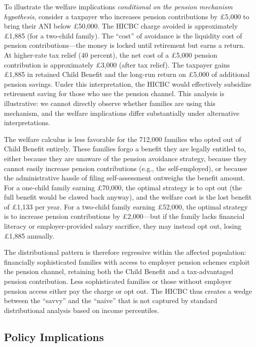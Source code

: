 \documentclass[12pt]{article}
\begin{document}
To illustrate the welfare implications \emph{conditional on the pension mechanism hypothesis}, consider a taxpayer who increases pension contributions by \pounds5,000 to bring their ANI below \pounds50,000. The HICBC charge avoided is approximately \pounds1,885 (for a two-child family). The ``cost'' of avoidance is the liquidity cost of pension contributions---the money is locked until retirement but earns a return. At higher-rate tax relief (40 percent), the net cost of a \pounds5,000 pension contribution is approximately \pounds3,000 (after tax relief). The taxpayer gains \pounds1,885 in retained Child Benefit and the long-run return on \pounds5,000 of additional pension savings. Under this interpretation, the HICBC would effectively subsidize retirement saving for those who use the pension channel. This analysis is illustrative: we cannot directly observe whether families are using this mechanism, and the welfare implications differ substantially under alternative interpretations.

The welfare calculus is less favorable for the 712,000 families who opted out of Child Benefit entirely. These families forgo a benefit they are legally entitled to, either because they are unaware of the pension avoidance strategy, because they cannot easily increase pension contributions (e.g., the self-employed), or because the administrative hassle of filing self-assessment outweighs the benefit amount. For a one-child family earning \pounds70,000, the optimal strategy is to opt out (the full benefit would be clawed back anyway), and the welfare cost is the lost benefit of \pounds1,133 per year. For a two-child family earning \pounds52,000, the optimal strategy is to increase pension contributions by \pounds2,000---but if the family lacks financial literacy or employer-provided salary sacrifice, they may instead opt out, losing \pounds1,885 annually.

The distributional pattern is therefore regressive within the affected population: financially sophisticated families with access to employer pension schemes exploit the pension channel, retaining both the Child Benefit and a tax-advantaged pension contribution. Less sophisticated families or those without employer pension access either pay the charge or opt out. The HICBC thus creates a wedge between the ``savvy'' and the ``naive'' that is not captured by standard distributional analysis based on income percentiles.

\subsection{Policy Implications}
\end{document}
